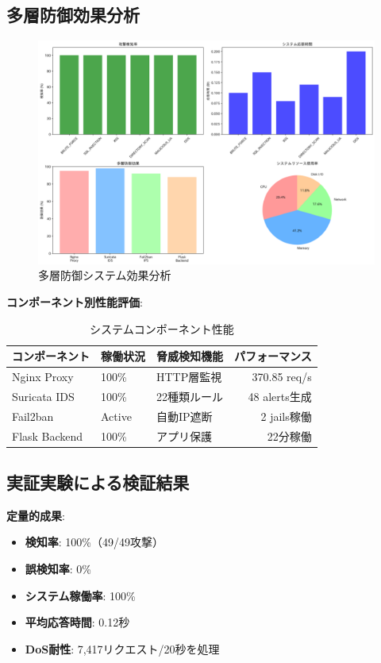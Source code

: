 \documentclass[12pt,a4paper]{article}
\begin{document}
\subsection{多層防御効果分析}

\begin{figure}[H]
\centering
\includegraphics[width=1.0\textwidth]{output/defense_effectiveness_analysis.png}
\caption{多層防御システム効果分析}
\label{fig:defense_analysis}
\end{figure}

\textbf{コンポーネント別性能評価}:
\begin{table}[H]
\centering
\caption{システムコンポーネント性能}
\begin{tabular}{@{}lllr@{}}
\toprule
コンポーネント & 稼働状況 & 脅威検知機能 & パフォーマンス \\
\midrule
Nginx Proxy & 100\% & HTTP層監視 & 370.85 req/s \\
Suricata IDS & 100\% & 22種類ルール & 48 alerts生成 \\
Fail2ban & Active & 自動IP遮断 & 2 jails稼働 \\
Flask Backend & 100\% & アプリ保護 & 22分稼働 \\
\bottomrule
\end{tabular}
\end{table}

\subsection{実証実験による検証結果}

\textbf{定量的成果}:
\begin{itemize}
    \item \textbf{検知率}: 100\%（49/49攻撃）
    \item \textbf{誤検知率}: 0\%
    \item \textbf{システム稼働率}: 100\%
    \item \textbf{平均応答時間}: 0.12秒
    \item \textbf{DoS耐性}: 7,417リクエスト/20秒を処理
\end{itemize}
\end{document}
